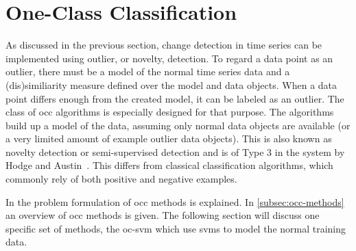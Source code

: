 \section{One-Class Classification}\label{sec:one_class_classification}
As discussed in the previous section, change detection in time series can be implemented using outlier, or novelty, detection.
To regard a data point as an outlier, there must be a model of the normal time series data and a (dis)similiarity measure defined over the model and data objects.
When a data point differs enough from the created model, it can be labeled as an outlier.
The class of \gls{occ} algorithms is especially designed for that purpose.
The algorithms build up a model of the data, assuming only normal data objects are available (or a very limited amount of example outlier data objects).
This is also known as novelty detection or semi-supervised detection and is of Type 3 in the system by Hodge and Austin~\cite{hodge2004survey}.
This differs from classical classification algorithms, which commonly rely of both positive and negative examples.

In  the problem formulation of \gls{occ} methods is explained.
In \cref{subsec:occ-methods} an overview of \gls{occ} methods is given.
The following section will discuss one specific set of methods, the \gls{oc-svm} which use \glspl{svm} to model the normal training data.


